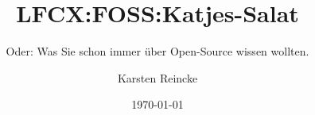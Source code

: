 \documentclass[]{beamer}
\title{LFCX:FOSS:Katjes-Salat}
\subtitle{Oder: Was Sie schon immer über Open-Source wissen wollten.}
\institute[GS-LDK]{Gewerbliche Schulen Dillenburg}
\author{Karsten Reincke}
\date{\today}
\def\cfgGl{../../../../cfg.gl/}
\begin{document}

\begin{frame}
  \titlepage

  

  
\end{frame}







\logo{}
\newpage



%
\end{document}
